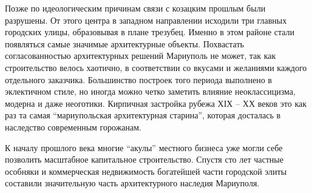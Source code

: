 Позже по идеологическим причинам связи с козацким прошлым были разрушены. От
этого центра в западном направлении исходили три главных городских улицы,
образовывая в плане трезубец. Именно в этом районе стали появляться самые
значимые архитектурные объекты. Похвастать согласованностью архитектурных
решений Мариуполь не может, так как строительство велось хаотично, в
соответствии со вкусами и желаниями каждого отдельного заказчика. Большинство
построек того периода выполнено в эклектичном стиле, но иногда можно четко
заметить влияние неоклассицизма, модерна и даже неоготики. Кирпичная застройка
рубежа ХІХ – ХХ веков это как раз та самая \enquote{мариупольская архитектурная
старина}, которая досталась в наследство современным горожанам.

К началу прошлого века многие \enquote{акулы} местного бизнеса уже могли себе позволить
масштабное капитальное строительство. Спустя сто лет частные особняки и
коммерческая недвижимость богатейшей части городской элиты составили
значительную часть архитектурного наследия Мариуполя.



